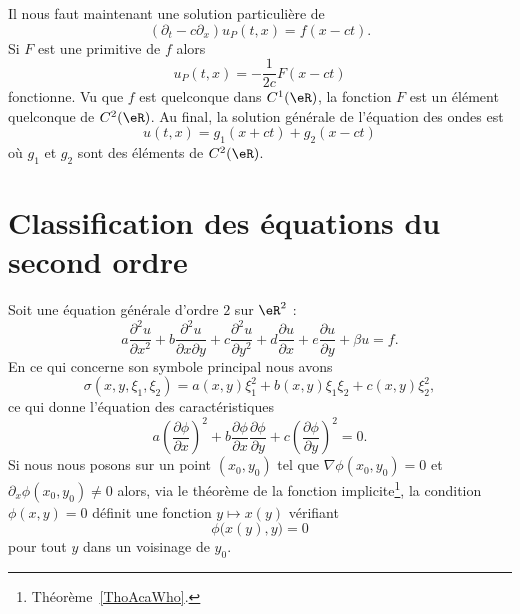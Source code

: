 Il nous faut maintenant une solution particulière de
\begin{equation}
    (\partial_t-c\partial_x)u_P(t,x)=f(x-ct).
\end{equation}
Si \( F\) est une primitive de \( f\) alors
\begin{equation}
    u_P(t,x)=-\frac{ 1 }{ 2c }F(x-ct)
\end{equation}
fonctionne. Vu que \( f\) est quelconque dans \( C^1(\eR)\), la fonction \( F\) est un élément quelconque de \( C^2(\eR)\). Au final, la solution générale de l'équation des ondes est
\begin{equation}
    u(t,x)=g_1(x+ct)+g_2(x-ct)
\end{equation}
où \( g_1\) et \( g_2\) sont des éléments de \( C^2(\eR)\).

\section{Classification des équations du second ordre}

Soit une équation générale d'ordre \( 2\) sur \( \eR^2\) :
\begin{equation}
    a\frac{ \partial^2 u }{ \partial x^2 }+b\frac{ \partial^2u }{ \partial x\partial y }+c\frac{ \partial^2u }{ \partial y^2 }+d\frac{ \partial u }{ \partial x }+e\frac{ \partial u }{ \partial y }+\beta u=f.
\end{equation}
En ce qui concerne son symbole principal nous avons
\begin{equation}
    \sigma(x,y,\xi_1,\xi_2)=a(x,y)\xi_1^2+b(x,y)\xi_1\xi_2+c(x,y)\xi_2^2,
\end{equation}
ce qui donne l'équation des caractéristiques
\begin{equation}        \label{EQooSAFNooEimPhO}
    a\left( \frac{ \partial \phi }{ \partial x } \right)^2+b\frac{ \partial \phi }{ \partial x }\frac{ \partial \phi }{ \partial y }+c\left( \frac{ \partial \phi }{ \partial y } \right)^2=0.
\end{equation}
Si nous nous posons sur un point \( (x_0,y_0)\) tel que \( \nabla\phi(x_0,y_0)=0\) et \( \partial_x\phi(x_0,y_0)\neq 0\) alors, via le théorème de la fonction implicite\footnote{Théorème~\ref{ThoAcaWho}.}, la condition \( \phi(x,y)=0\) définit une fonction \( y\mapsto x(y)\) vérifiant
\begin{equation}
    \phi\big( x(y),y \big)=0
\end{equation}
pour tout \( y\) dans un voisinage de \( y_0\).

